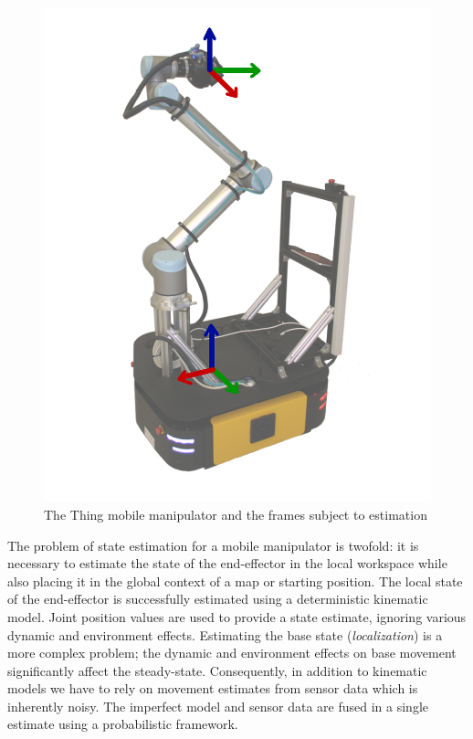 \documentclass[times, utf8, diplomski, english]{fer}
\begin{document}
\begin{figure}[h]
\centering
\includegraphics[scale=0.4]{Thingtr}
\caption{The Thing mobile manipulator and the frames subject to estimation}
\label{figure:thing states}
\end{figure}

The problem of state estimation for a mobile manipulator is twofold: it is necessary to estimate the state of the end-effector in the local workspace while also placing it in the global context of a map or starting position.
The local state of the end-effector is successfully estimated using a deterministic kinematic model.
Joint position values are used to provide a state estimate, ignoring various dynamic and environment effects.
Estimating the base state (\textit{localization}) is a more complex problem; the dynamic and environment effects on base movement significantly affect the steady-state.
Consequently, in addition to kinematic models we have to rely on movement estimates from sensor data which is inherently noisy.
The imperfect model and sensor data are fused in a single estimate using a probabilistic framework.
\end{document}
